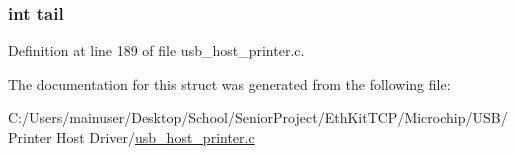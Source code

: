 \subsubsection[{tail}]{\setlength{\rightskip}{0pt plus 5cm}int tail}\label{struct___u_s_b___p_r_i_n_t_e_r___q_u_e_u_e_aff39d864a6594bc5f4a5e365282e00fe}


Definition at line 189 of file usb\+\_\+host\+\_\+printer.\+c.



The documentation for this struct was generated from the following file\+:\begin{DoxyCompactItemize}
\item 
C\+:/\+Users/mainuser/\+Desktop/\+School/\+Senior\+Project/\+Eth\+Kit\+T\+C\+P/\+Microchip/\+U\+S\+B/\+Printer Host Driver/\hyperlink{usb__host__printer_8c}{usb\+\_\+host\+\_\+printer.\+c}\end{DoxyCompactItemize}
